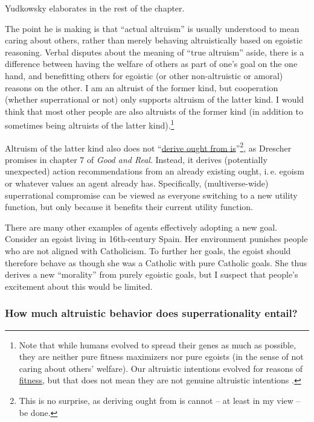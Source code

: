 Yudkowsky elaborates in the rest of the chapter.

The point he is making is that ``actual altruism'' is usually understood
to mean caring about others, rather than merely behaving altruistically
based on egoistic reasoning. Verbal disputes about the meaning of ``true
altruism'' aside, there is a difference between having the welfare of
others as part of one's goal on the one hand, and benefitting others for
egoistic (or other non-altruistic or amoral) reasons on the other. I am
an altruist of the former kind, but cooperation (whether superrational
or not) only supports altruism of the latter kind. I would think that
most other people are also altruists of the former kind (in addition to
sometimes being altruists of the latter kind).\footnote{Note that while
  humans evolved to spread their genes as much as possible, they are
  neither pure fitness maximizers nor pure egoists (in the sense of not
  caring about others' welfare). Our altruistic intentions evolved for
  reasons of
  \href{https://en.wikipedia.org/wiki/Fitness_\%28biology\%29}{fitness},
  but that does not mean they are not genuine altruistic intentions
  \parencites[][section 138]{Yudkowsky2015-tz}[][pp. 54f.]{Cosmides1995-bz}[][pp. 225f.]{Wright1995-po}.}

Altruism of the latter kind also does not
``\href{https://en.wikipedia.org/wiki/Is\%E2\%80\%93ought_problem}{derive
ought from is}''\footnote{This is no surprise, as
  deriving ought from is cannot -- at least in my view -- be done.}, as
Drescher promises in chapter 7 of \emph{Good and Real}. Instead, it
derives (potentially unexpected) action recommendations from an already
existing ought, i.\,e. egoism or whatever values an agent already has.
Specifically, (multiverse-wide) superrational compromise can be viewed
as everyone switching to a new utility function, but only because it
benefits their current utility function.

There are many other examples of agents effectively adopting a new goal.
Consider an egoist living in 16th-century Spain. Her environment
punishes people who are not aligned with Catholicism. To further her
goals, the egoist should therefore behave as though she was a Catholic
with pure Catholic goals. She thus derives a new ``morality'' from
purely egoistic goals, but I suspect that people's excitement about this
would be limited.

\subsubsection{How much altruistic behavior does superrationality
entail?}\label{how-much-altruistic-behavior-does-superrationality-entail}


